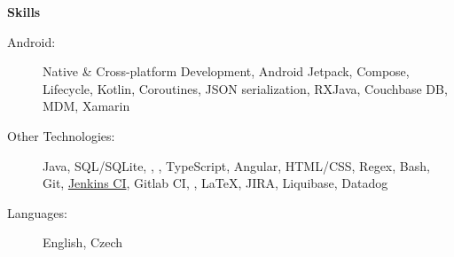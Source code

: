\documentclass[letterpaper,11pt]{article}
\newcommand{\resheading}[1]{{\large \colorbox{mygrey}{\begin{minipage}{\textwidth}{\textbf{#1 \vphantom{p\^{E}}}}\end{minipage}}}}
\begin{document}
\resheading{Skills}
	\begin{description}
			\item[Android:] { 
			Native \& Cross-platform Development, Android Jetpack, Compose, Lifecycle, Kotlin, Coroutines, JSON serialization, RXJava, Couchbase DB, MDM,  Xamarin
		}
		\item[Other Technologies:] { Java, SQL/SQLite, \CS, , TypeScript, Angular, HTML/CSS, Regex, Bash, 
			Git, \href{http://jenkins-ci.org/}{Jenkins CI}, Gitlab CI, \CS, \LaTeX, JIRA, Liquibase, Datadog
		}
		\item[Languages:] { 
			English, Czech
		}
	\end{description} %


		
\end{document}
